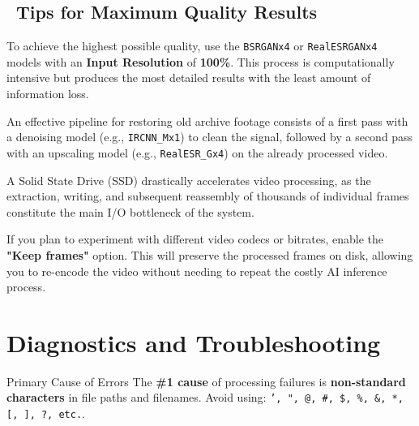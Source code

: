 \documentclass[11pt, a4paper]{article}
\newcommand{\SectionColor}{WarlockGray} %
\newcommand{\setsectioncolor}[1]{\renewcommand{\SectionColor}{#1}}
\begin{document}
\subsection{\faTrophy\ Tips for Maximum Quality Results}
\begin{description}[leftmargin=*, style=nextline, itemsep=0.8em]
    \item[Maximizing Visual Fidelity] To achieve the highest possible quality, use the \texttt{BSRGANx4} or \texttt{RealESRGANx4} models with an \textbf{Input Resolution} of \textbf{100\%}. This process is computationally intensive but produces the most detailed results with the least amount of information loss.
    \item[Workflow for Video Restoration] An effective pipeline for restoring old archive footage consists of a first pass with a denoising model (e.g., \texttt{IRCNN_Mx1}) to clean the signal, followed by a second pass with an upscaling model (e.g., \texttt{RealESR_Gx4}) on the already processed video.
    \item[Impact of SSD Storage] A Solid State Drive (SSD) drastically accelerates video processing, as the extraction, writing, and subsequent reassembly of thousands of individual frames constitute the main I/O bottleneck of the system.
    \item[Frame Persistence for Experimentation] If you plan to experiment with different video codecs or bitrates, enable the \textbf{"Keep frames"} option. This will preserve the processed frames on disk, allowing you to re-encode the video without needing to repeat the costly AI inference process.
\end{description}

\setsectioncolor{TroubleColor}
\section{Diagnostics and Troubleshooting}
\begin{warnbox}{Primary Cause of Errors}
The \textbf{\#1 cause} of processing failures is \textbf{non-standard characters} in file paths and filenames. Avoid using: \texttt{', ", @, \#, \$, \%, \&, *, [, ], ?, etc.}.
\end{warnbox}
\end{document}
